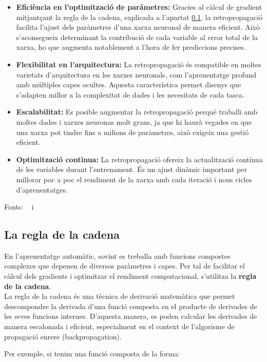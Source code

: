 \begin{itemize}
 \item \textbf{Eficiència en l'optimització de parámetres:} Gracies al càlcul de gradient mitjantçant la regla de la cadena, explicada a l'apartat \ref{subsec:cadena}, la retropropagació facilita l'ajust dels paràmetres d'una xarxa neuronal de manera eficient. Això s'aconsegueix determinant la contribució de cada variable al error total de la xarxa, ho que augmenta notablement a l'hora de fer prediccions precises.
 \item \textbf{Flexibilitat en l'arquitectura:} La retropropagació és compatible en moltes varietats d'arquitectura en les xarxes neuronals, com l'aprenentatge profund amb múltiples capes ocultes. Aquesta característica permet disenys que s'adapten millor a la complexitat de dades i les necesitats de cada tasca.
 \item \textbf{Escalabilitat:} Es posible augmentar la retropropagació perquè traballi amb moltes dades i xarxes neuronas molt grans, ja que hi haurà vegades en que una xarxa pot tindre fins a milions de paràmetres, això exigeix una gestió eficient.
 \item \textbf{Optimització continua:} La retropropagació ofereix la actualització contínua de les variables durant l'entrenament. És un ajust dinàmic important per millorar poc a poc el rendiment de la xarxa amb cada iteració i nous cicles d'aprenentatges.
\end{itemize}
Fonts: ~\cite{valencia} i ~\cite{Retropropagacio}


\subsection{La regla de la cadena}\label{subsec:cadena}

En l'aprenentatge automàtic, sovint es treballa amb funcions compostes complexes que depenen de diversos paràmetres i capes. Per tal de facilitar el càlcul dels gradients i optimitzar el rendiment computacional, s'utilitza la \textbf{regla de la cadena}.\\

La regla de la cadena és una tècnica de derivació matemàtica que permet descompondre la derivada d'una funció composta en el producte de derivades de les seves funcions internes. D’aquesta manera, es poden calcular les derivades de manera escalonada i eficient, especialment en el context de l’algorisme de propagació enrere (backpropagation).

Per exemple, si tenim una funció composta de la forma:

